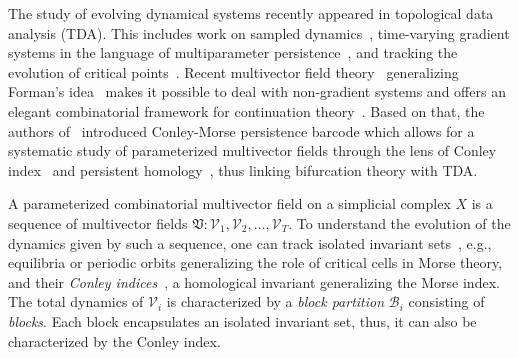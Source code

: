\documentclass[letterpaper,11pt]{article}
\theoremstyle{plain}
\theoremstyle{definition}
\def\cB{\text{$\mathcal B$}}
\def\cV{\text{$\mathcal V$}}
\newcounter{li}
\newcommand{\zzV}{\mathfrak{V}}
\begin{document}
The study of evolving dynamical systems recently appeared in topological data analysis (TDA). This includes work on sampled dynamics~\cite{GuMuKh2022,Kim:2021wx, TyMuKh2020}, time-varying gradient systems
in the language of multiparameter persistence~\cite{Bubenik2024}, and tracking the evolution
of critical points~\cite{King2017, MeLiCh2026, ReininghausHotz2012, Hotz2023}. 
Recent multivector field theory~\cite{LKMW2022, Mrozek2017} generalizing Forman's idea~\cite{Forman1998b} makes it possible to deal with non-gradient systems and offers an elegant  combinatorial framework for continuation theory~\cite{Franzosa1988}.
Based on that, the authors of~\cite{CMbarcodes2025} introduced Conley-Morse persistence barcode which allows for a systematic study of parameterized multivector fields through the lens of Conley index~\cite{Conley1978} and persistent homology~\cite{DW22, EdelsHarer2008}, thus linking bifurcation theory with TDA.


A parameterized combinatorial multivector field on a simplicial complex $X$ is a sequence of multivector fields $\zzV:\cV_1,\cV_2,\ldots,\cV_T$.  
To understand the evolution of the dynamics given by such a sequence, one can track isolated invariant sets~\cite{DeLiMrSl2022,CMbarcodes2025}, e.g., equilibria or periodic orbits generalizing the role of critical cells in Morse theory, 
    and their \emph{Conley indices}~\cite{Conley1978, MischMro_Conley_2002}, a homological invariant generalizing the Morse index.
The total dynamics of $\cV_i$ is characterized by a \emph{block partition} $\cB_i$ consisting of \emph{blocks}.
Each block encapsulates an isolated invariant set, thus, it can also be characterized by the Conley index.
\end{document}
